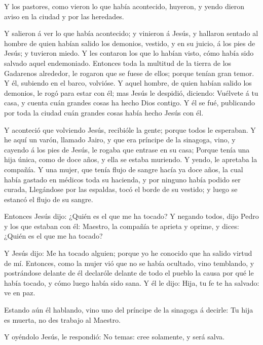  Y los pastores, como vieron lo que había acontecido,
huyeron, y yendo dieron aviso en la ciudad y por las heredades.

 Y salieron á ver lo que había acontecido; y vinieron á
Jesús, y hallaron sentado al hombre de quien habían salido los demonios,
vestido, y en su juicio, á los pies de Jesús; y tuvieron miedo.
 Y les contaron los que lo habían visto, cómo había sido
salvado aquel endemoniado.  Entonces toda la multitud de la
tierra de los Gadarenos alrededor, le rogaron que se fuese de ellos;
porque tenían gran temor. Y él, subiendo en el barco, volvióse.
 Y aquel hombre, de quien habían salido los demonios, le
rogó para estar con él; mas Jesús le despidió, diciendo: 
Vuélvete á tu casa, y cuenta cuán grandes cosas ha hecho Dios contigo. Y
él se fué, publicando por toda la ciudad cuán grandes cosas había hecho
Jesús con él.

 Y aconteció que volviendo Jesús, recibióle la gente;
porque todos le esperaban.  Y he aquí un varón, llamado
Jairo, y que era príncipe de la sinagoga, vino, y cayendo á los pies de
Jesús, le rogaba que entrase en su casa;  Porque tenía una
hija única, como de doce años, y ella se estaba muriendo. Y yendo, le
apretaba la compañía.  Y una mujer, que tenía flujo de
sangre hacía ya doce años, la cual había gastado en médicos toda su
hacienda, y por ninguno había podido ser curada, 
Llegándose por las espaldas, tocó el borde de su vestido; y luego se
estancó el flujo de su sangre.

 Entonces Jesús dijo: ¿Quién es el que me ha tocado? Y
negando todos, dijo Pedro y los que estaban con él: Maestro, la compañía
te aprieta y oprime, y dices: ¿Quién es el que me ha tocado?

 Y Jesús dijo: Me ha tocado alguien; porque yo he conocido
que ha salido virtud de mí.  Entonces, como la mujer vió
que no se había ocultado, vino temblando, y postrándose delante de él
declaróle delante de todo el pueblo la causa por qué le había tocado, y
cómo luego había sido sana.  Y él le dijo: Hija, tu fe te
ha salvado: ve en paz.

 Estando aún él hablando, vino uno del príncipe de la
sinagoga á decirle: Tu hija es muerta, no des trabajo al Maestro.

 Y oyéndolo Jesús, le respondió: No temas: cree solamente,
y será salva.

